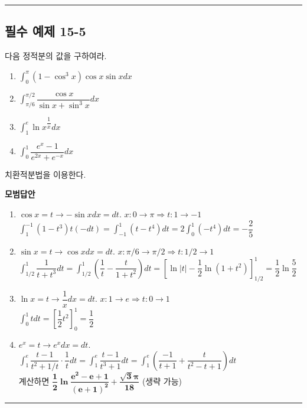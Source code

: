 \documentclass[a4paper,11pt]{article}
\begin{document}
\vspace{0.5cm}
\hrule
\vspace{0.5cm}

\subsection*{필수 예제 15-5}
다음 정적분의 값을 구하여라.
\begin{enumerate}[label=(\arabic*)]
    \item $\displaystyle\int_{0}^{\pi} (1-\cos^3 x)\cos x \sin x dx$
    \item $\displaystyle\int_{\pi/6}^{\pi/2} \dfrac{\cos x}{\sin x + \sin^3 x} dx$
    \item $\displaystyle\int_{1}^{e} \ln x^{\dfrac{1}{x}} dx$
    \item $\displaystyle\int_{0}^{1} \dfrac{e^x-1}{e^{2x}+e^{-x}} dx$
\end{enumerate}

\begin{studybox}
치환적분법을 이용한다. 
\end{studybox}

\textbf{모범답안}
\begin{enumerate}[label=(\arabic*)]
    \item $\cos x = t \to -\sin x dx = dt$. $x: 0 \to \pi \Rightarrow t: 1 \to -1$\\
    $\int_{1}^{-1} (1-t^3)t (-dt) = \int_{-1}^{1} (t-t^4) dt = 2\int_{0}^{1} (-t^4) dt = -\dfrac{2}{5}$
    \item $\sin x = t \to \cos x dx = dt$. $x: \pi/6 \to \pi/2 \Rightarrow t: 1/2 \to 1$\\
    $\int_{1/2}^{1} \dfrac{1}{t+t^3} dt = \int_{1/2}^{1} (\dfrac{1}{t} - \dfrac{t}{1+t^2}) dt = [\ln |t| - \dfrac{1}{2}\ln(1+t^2)]_{1/2}^1 = \dfrac{1}{2}\ln \dfrac{5}{2}$
    \item $\ln x = t \to \dfrac{1}{x}dx = dt$. $x: 1 \to e \Rightarrow t: 0 \to 1$\\
    $\int_{0}^{1} t dt = [\dfrac{1}{2}t^2]_0^1 = \dfrac{1}{2}$
    \item $e^x=t \to e^xdx=dt$. $\int_{1}^{e} \dfrac{t-1}{t^2+1/t} \cdot \dfrac{1}{t} dt = \int_{1}^{e} \dfrac{t-1}{t^3+1} dt = \int_{1}^{e} (\dfrac{-1}{t+1} + \dfrac{t}{t^2-t+1}) dt$\\
    계산하면 $\mathbf{\dfrac{1}{2}\ln \dfrac{e^2-e+1}{(e+1)^2} + \dfrac{\sqrt{3}\pi}{18}}$ (생략 가능)
\end{enumerate}

\vspace{0.5cm}
\hrule
\vspace{0.5cm}
\end{document}
